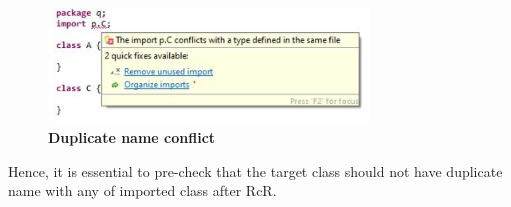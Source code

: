 \begin{figure}[H]
\centerline{\includegraphics[width=85mm,scale=0.5]{CNF.jpg}}
\caption{\textbf{Duplicate name conflict} }
\label{figure:conflict}
\end{figure}

Hence, it is essential to pre-check that the target class should not have duplicate name with any of imported class after RcR.
